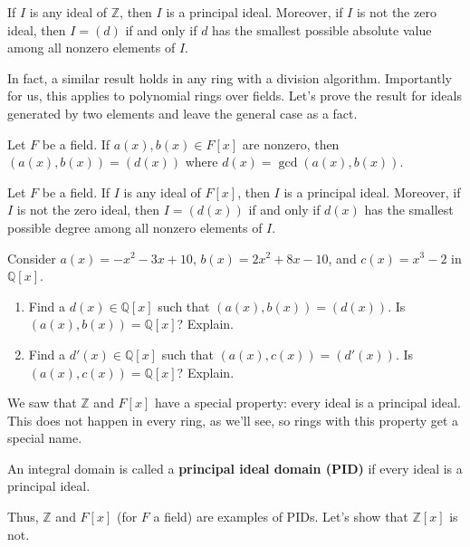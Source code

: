 \begin{fact}\label{fact.ZPID}
If $I$ is any ideal of $\mathbb{Z}$, then $I$ is a principal ideal. Moreover, if $I$ is not the zero ideal, then $I = (d)$ if and only if $d$ has the smallest possible absolute value among all nonzero elements of $I$.
\end{fact}

In fact, a similar result holds in any ring with a division algorithm. Importantly for us, this applies to polynomial rings over fields. Let's prove the result for ideals generated by two elements and leave the general case as a fact.

\begin{theorem}\label{thm.TwoGeneratedIsPrincipalFx}
Let $F$ be a field. If $a(x),b(x)\in F[x]$ are nonzero, then $(a(x),b(x)) = (d(x))$ where $d(x) = \gcd(a(x),b(x))$.
\end{theorem}

\begin{fact}\label{fact.FxPID}
Let $F$ be a field. If $I$ is any ideal of $F[x]$, then $I$ is a principal ideal. Moreover, if $I$ is not the zero ideal, then $I = (d(x))$ if and only if $d(x)$ has the smallest possible degree among all nonzero elements of $I$.
\end{fact}

\begin{problem}\label{prob.ShowIdealIsPrincipalQx}
Consider $a(x) = -x^2 -3x + 10$, $b(x) = 2x^2 + 8x - 10$, and $c(x) = x^3 - 2$ in $\mathbb{Q}[x]$.
\begin{enumerate}
\item Find a $d(x) \in \mathbb{Q}[x]$ such that $(a(x),b(x)) = (d(x))$. Is $(a(x),b(x)) = \mathbb{Q}[x]$? Explain.
\item Find a $d'(x) \in \mathbb{Q}[x]$ such that $(a(x),c(x)) = (d'(x))$. Is $(a(x),c(x)) = \mathbb{Q}[x]$? Explain.
\end{enumerate}
\end{problem}

We saw that $\mathbb{Z}$ and $F[x]$ have a special property: every ideal is a principal ideal. This does not happen in every ring, as we'll see, so rings with this property get a special name.

\begin{definition}
An integral domain is called a \textbf{principal ideal domain (PID)} if every ideal is a principal ideal.
\end{definition}

Thus, $\mathbb{Z}$ and $F[x]$ (for $F$ a field) are examples of PIDs. Let's show that $\mathbb{Z}[x]$ is not.

